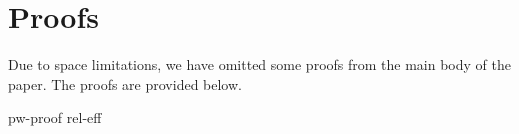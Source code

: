 \section{Proofs}
\label{app:proofs}

Due to space limitations, we have omitted some proofs from
the main body of the paper.  The proofs are provided below.

{pw-proof}
{rel-eff}

